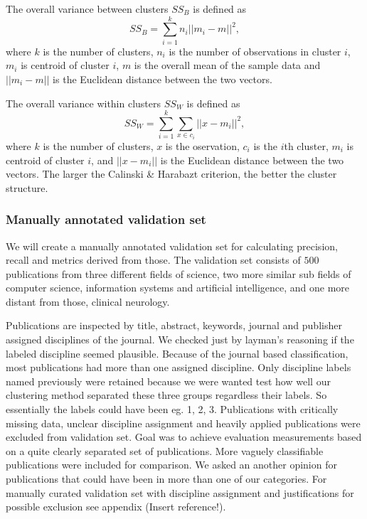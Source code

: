 The overall variance between clusters $SS_B$ is defined as
\begin{equation}
 SS_B = \sum_{i=1}^k n_i ||m_i-m||^2,
\end{equation}
where $k$ is the number of clusters, $n_i$ is the number of 
observations in cluster $i$, $m_i$ is centroid of cluster $i$, 
$m$ is the overall mean of the sample data and $||m_i-m||$ is the 
Euclidean distance between the two vectors.

The overall variance within clusters $SS_W$ is defined as
\begin{equation}
 SS_W = \sum_{i=1}^k \sum_{x\in c_i} ||x-m_i||^2,
\end{equation}
where $k$ is the number of clusters, $x$ is the oservation, 
$c_i$ is the $i$th cluster, $m_i$ is centroid of cluster $i$, and 
$||x-m_i||$ is the Euclidean distance between the two vectors.
The larger the Calinski \& Harabazt criterion, the better the 
cluster structure.



\subsubsection{Manually annotated validation set}
We will create a manually annotated validation set for calculating
precision, recall and metrics derived from those.
The validation
set consists of $500$ publications from three different fields of
science, two more similar sub fields of computer science, 
information systems and artificial intelligence, and one more
distant from those, clinical neurology.

Publications are inspected by title, abstract, keywords, journal
and publisher assigned disciplines of the journal. We checked 
just by layman's reasoning if the labeled discipline seemed 
plausible. Because of the journal based 
classification, most publications had more than one 
assigned discipline. Only discipline labels named 
previously were retained because we were wanted test 
how well our clustering method separated these three 
groups regardless their labels. So essentially the 
labels could have been eg. 1, 2, 3. Publications
with critically missing data, unclear discipline assignment and
heavily applied publications were excluded from validation set.
Goal was to achieve evaluation measurements based on a quite 
clearly separated set of publications. More vaguely classifiable
publications were included for comparison. We asked an another 
opinion for publications that could have been in more 
than one of our categories. For manually curated validation set 
with discipline assignment and justifications for
possible exclusion see appendix (Insert reference!).

